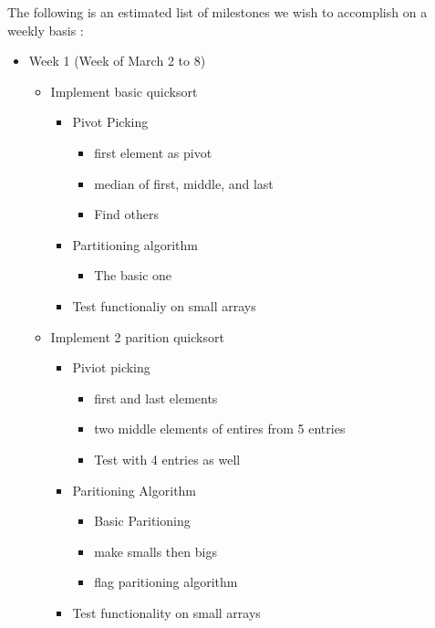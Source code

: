 \documentclass[12pt]{report}
\begin{document}
	The following is an estimated list of milestones we wish to accomplish on a weekly basis :
	\begin{itemize}
		\item Week 1 (Week of March 2 to 8)
		\begin{itemize}
			\item Implement basic quicksort
			\begin{itemize}
				\item Pivot Picking
				\begin{itemize}
					\item first element as pivot
					\item median of first, middle, and last
					\item Find others
				\end{itemize}
				
				\item Partitioning algorithm
				\begin{itemize}
					\item The basic one
				\end{itemize}
				\item Test functionaliy on small arrays
			\end{itemize}
			
			\item Implement 2 parition quicksort
			\begin{itemize}
				\item Piviot picking
				\begin{itemize}
					\item first and last elements
					\item two middle elements of entires from 5 entries
					\item Test with 4 entries as well
				\end{itemize}
				\item Paritioning Algorithm
				\begin{itemize}
					\item Basic Paritioning
					\item make smalls then bigs
					\item flag paritioning algorithm
				\end{itemize}
				\item Test functionality on small arrays
			\end{itemize}
		\end{itemize}
			

\end{itemize}
\end{document}
